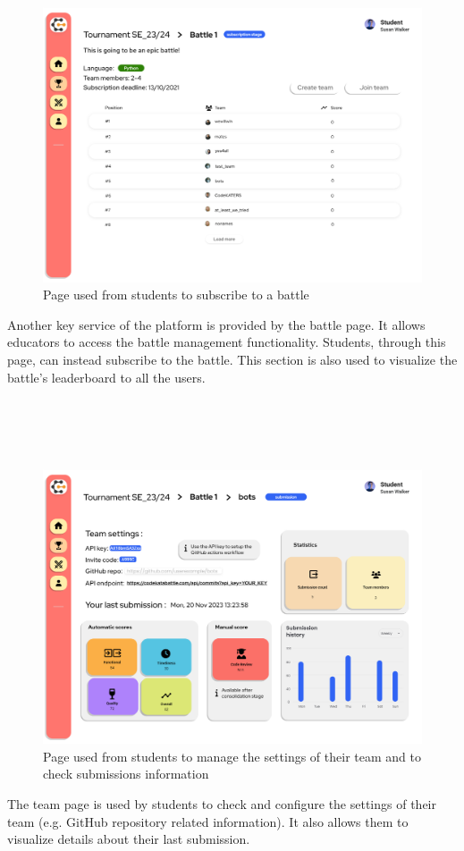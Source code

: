 \begin{figure}[H]
    \centering
    \includegraphics[width=1\textwidth]{Mockups/11_student_battle_subscription.png}
    \caption{Page used from students to subscribe to a battle}
\end{figure}
\newpage
\hfill \break
Another key service of the platform is provided by the battle page. It allows educators to access the battle management functionality. Students, through this page, can instead subscribe to the battle. This section is also used to visualize the battle's leaderboard to all the users. \\ \\ \\ \\ \\

\begin{figure}[H]
    \centering
    \includegraphics[width=1\textwidth]{Mockups/15_student_team.png}
    \caption{Page used from students to manage the settings of their team and to check submissions information}
\end{figure}
\newpage
\hfill \break
The team page is used by students to check and configure the settings of their team (e.g. GitHub repository related information). It also allows them to visualize details about their last submission.


